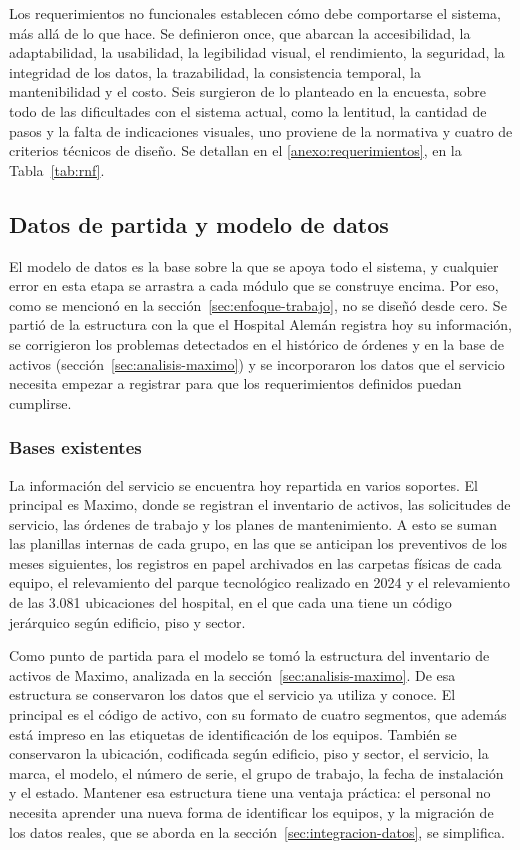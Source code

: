 \documentclass[10pt]{article}
\begin{document}
Los requerimientos no funcionales establecen cómo debe comportarse el sistema, más allá de lo que hace. Se definieron once, que abarcan la accesibilidad, la adaptabilidad, la usabilidad, la legibilidad visual, el rendimiento, la seguridad, la integridad de los datos, la trazabilidad, la consistencia temporal, la mantenibilidad y el costo. Seis surgieron de lo planteado en la encuesta, sobre todo de las dificultades con el sistema actual, como la lentitud, la cantidad de pasos y la falta de indicaciones visuales, uno proviene de la normativa y cuatro de criterios técnicos de diseño. Se detallan en el \ref{anexo:requerimientos}, en la Tabla~\ref{tab:rnf}.

\subsection{Datos de partida y modelo de datos}
El modelo de datos es la base sobre la que se apoya todo el sistema, y cualquier error en esta etapa se arrastra a cada módulo que se construye encima. Por eso, como se mencionó en la sección~\ref{sec:enfoque-trabajo}, no se diseñó desde cero. Se partió de la estructura con la que el Hospital Alemán registra hoy su información, se corrigieron los problemas detectados en el histórico de órdenes y en la base de activos (sección~\ref{sec:analisis-maximo}) y se incorporaron los datos que el servicio necesita empezar a registrar para que los requerimientos definidos puedan cumplirse. 

\subsubsection{Bases existentes}
\label{sec:bases-existentes}
La información del servicio se encuentra hoy repartida en varios soportes. El principal es Maximo, donde se registran el inventario de activos, las solicitudes de servicio, las órdenes de trabajo y los planes de mantenimiento. A esto se suman las planillas internas de cada grupo, en las que se anticipan los preventivos de los meses siguientes, los registros en papel archivados en las carpetas físicas de cada equipo, el relevamiento del parque tecnológico realizado en 2024 y el relevamiento de las 3.081 ubicaciones del hospital, en el que cada una tiene un código jerárquico según edificio, piso y sector. 

Como punto de partida para el modelo se tomó la estructura del inventario de activos de Maximo, analizada en la sección~\ref{sec:analisis-maximo}. De esa estructura se conservaron los datos que el servicio ya utiliza y conoce. El principal es el código de activo, con su formato de cuatro segmentos, que además está impreso en las etiquetas de identificación de los equipos. También se conservaron la ubicación, codificada según edificio, piso y sector, el servicio, la marca, el modelo, el número de serie, el grupo de trabajo, la fecha de instalación y el estado. Mantener esa estructura tiene una ventaja práctica: el personal no necesita aprender una nueva forma de identificar los equipos, y la migración de los datos reales, que se aborda en la sección~\ref{sec:integracion-datos}, se simplifica.
\end{document}
